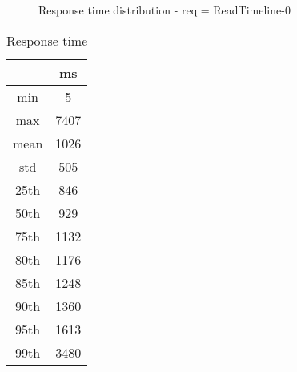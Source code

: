 \begin{minipage}{0.75\linewidth}
\begin{figure}[h]
\begin{adjustbox}{max width=1.0\linewidth, keepaspectratio}
  \end{adjustbox}
  \caption{Response time distribution - req = ReadTimeline-0}
\end{figure}
\end{minipage}\hfill\begin{minipage}{0.18\linewidth}
\begin{table}[h]
\begin{tabular}{|cc|}
\hline
\textbf{} & \textbf{ms}\\ \hline
 \Xhline{0.005\arrayrulewidth}
min & 5\\
 \Xhline{0.005\arrayrulewidth}
max & 7407\\
 \Xhline{0.005\arrayrulewidth}
mean & 1026\\
 \Xhline{0.005\arrayrulewidth}
std & 505\\
\hline
\hline
 \Xhline{0.005\arrayrulewidth}
25th & 846\\
 \Xhline{0.005\arrayrulewidth}
50th & 929\\
 \Xhline{0.005\arrayrulewidth}
75th & 1132\\
 \Xhline{0.005\arrayrulewidth}
80th & 1176\\
 \Xhline{0.005\arrayrulewidth}
85th & 1248\\
 \Xhline{0.005\arrayrulewidth}
90th & 1360\\
 \Xhline{0.005\arrayrulewidth}
95th & 1613\\
 \Xhline{0.005\arrayrulewidth}
99th & 3480\\
\hline
\end{tabular}
\caption{Response time}
\end{table}
\end{minipage}\hfill